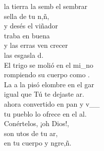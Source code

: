\begin{cancion}[El sembrador][]%
	 la tierra la semb el sembrar \\
	 sella de tu n,ñ,  \\
	y desés el viñador \\
	traba en buena  \\
	y las erras ven crecer \\
	las esgasla d.\\
	El trigo se molió en el mi_no\\
	rompiendo su cuerpo como .\\
	La a la pisó elombre en el gar\\
	igual que Tú te dejaste ar.\\
\jump
	ahora convertido en pan y v__\\
	tu pueblo lo ofrece en el al.\\
	Conértelos, ¡oh Dios!,\\
	son utos de tu ar,\\
	en tu cuerpo y ngre,ñ. \\
\end{cancion}%
